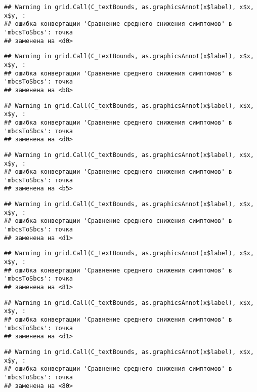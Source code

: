 \documentclass[
]{article}
\begin{document}
\begin{verbatim}
## Warning in grid.Call(C_textBounds, as.graphicsAnnot(x$label), x$x, x$y, :
## ошибка конвертации 'Сравнение среднего снижения симптомов' в 'mbcsToSbcs': точка
## заменена на <d0>
\end{verbatim}

\begin{verbatim}
## Warning in grid.Call(C_textBounds, as.graphicsAnnot(x$label), x$x, x$y, :
## ошибка конвертации 'Сравнение среднего снижения симптомов' в 'mbcsToSbcs': точка
## заменена на <b8>
\end{verbatim}

\begin{verbatim}
## Warning in grid.Call(C_textBounds, as.graphicsAnnot(x$label), x$x, x$y, :
## ошибка конвертации 'Сравнение среднего снижения симптомов' в 'mbcsToSbcs': точка
## заменена на <d0>
\end{verbatim}

\begin{verbatim}
## Warning in grid.Call(C_textBounds, as.graphicsAnnot(x$label), x$x, x$y, :
## ошибка конвертации 'Сравнение среднего снижения симптомов' в 'mbcsToSbcs': точка
## заменена на <b5>
\end{verbatim}

\begin{verbatim}
## Warning in grid.Call(C_textBounds, as.graphicsAnnot(x$label), x$x, x$y, :
## ошибка конвертации 'Сравнение среднего снижения симптомов' в 'mbcsToSbcs': точка
## заменена на <d1>
\end{verbatim}

\begin{verbatim}
## Warning in grid.Call(C_textBounds, as.graphicsAnnot(x$label), x$x, x$y, :
## ошибка конвертации 'Сравнение среднего снижения симптомов' в 'mbcsToSbcs': точка
## заменена на <81>
\end{verbatim}

\begin{verbatim}
## Warning in grid.Call(C_textBounds, as.graphicsAnnot(x$label), x$x, x$y, :
## ошибка конвертации 'Сравнение среднего снижения симптомов' в 'mbcsToSbcs': точка
## заменена на <d1>
\end{verbatim}

\begin{verbatim}
## Warning in grid.Call(C_textBounds, as.graphicsAnnot(x$label), x$x, x$y, :
## ошибка конвертации 'Сравнение среднего снижения симптомов' в 'mbcsToSbcs': точка
## заменена на <80>
\end{verbatim}
\end{document}
